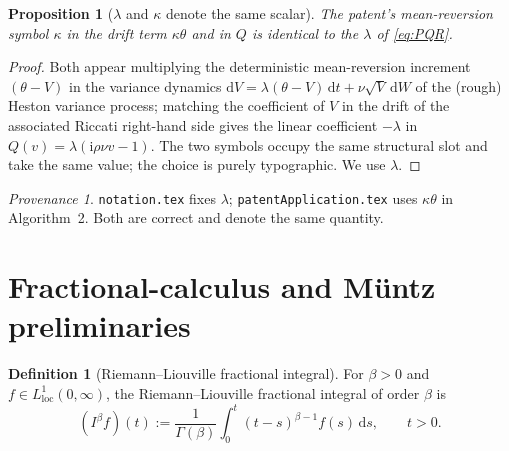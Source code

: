 \documentclass[11pt]{article}
\newcommand{\Ii}{\mathrm{i}}
\newcommand{\dd}{\mathrm{d}}
\theoremstyle{plain}
\newtheorem{proposition}[theorem]{Proposition}
\theoremstyle{definition}
\newtheorem{definition}[theorem]{Definition}
\theoremstyle{remark}
\newtheorem*{provenance}{Provenance}
\begin{document}
\begin{proposition}[$\lambda$ and $\kappa$ denote the same scalar]\label{prop:lambda-kappa}
The patent's mean-reversion symbol $\kappa$ in the drift term $\kappa\theta$ and
in $Q$ is identical to the $\lambda$ of \eqref{eq:PQR}.
\end{proposition}
\begin{proof}
Both appear multiplying the deterministic mean-reversion increment $(\theta-V)$
in the variance dynamics $\dd V=\lambda(\theta-V)\,\dd t+\nu\sqrt V\,\dd W$ of the
(rough) Heston variance process; matching the coefficient of $V$ in the drift of
the associated Riccati right-hand side gives the linear coefficient $-\lambda$ in
$Q(v)=\lambda(\Ii\rho\nu v-1)$. The two symbols occupy the same structural slot
and take the same value; the choice is purely typographic. We use $\lambda$.
\end{proof}
\begin{provenance}
\texttt{notation.tex} fixes $\lambda$; \texttt{patentApplication.tex} uses
$\kappa\theta$ in Algorithm~2. Both are correct and denote the same quantity.
\end{provenance}

\section{Fractional-calculus and Müntz preliminaries}
\label{sec:fraccalc}

\begin{definition}[Riemann--Liouville fractional integral]\label{def:RL}
For $\beta>0$ and $f\in L^1_{\mathrm{loc}}(0,\infty)$, the Riemann--Liouville
fractional integral of order $\beta$ is
\begin{equation}\label{eq:RL}
   (I^\beta f)(t):=\frac{1}{\Gamma(\beta)}\int_0^t (t-s)^{\beta-1}f(s)\,\dd s,
   \qquad t>0 .
\end{equation}
\end{definition}
\end{document}
